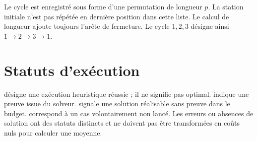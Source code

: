 Le cycle est enregistré sous forme d'une permutation de longueur $p$.
La station initiale n'est pas répétée en dernière position dans cette liste.
Le calcul de longueur ajoute toujours l'arête de fermeture. Le cycle
$1,2,3$ désigne ainsi $1\to2\to3\to1$.

\section{Statuts d'exécution}
 désigne une exécution heuristique réussie ; il ne signifie pas
optimal.  indique une preuve issue du solveur.
 signale une solution réalisable sans preuve
dans le budget.  correspond à un cas volontairement non lancé.
Les erreurs ou absences de solution ont des statuts distincts et ne doivent
pas être transformées en coûts nuls pour calculer une moyenne.
